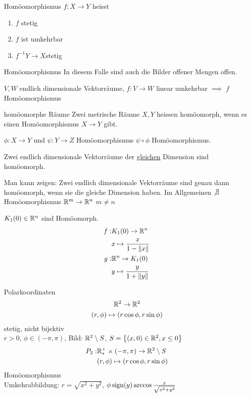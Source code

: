 \begin{Def}{Homöomorphismus}
  $f:X\to Y$ heisst
  \begin{enumerate}
    \item $f$ stetig
    \item $f$ ist umkehrbar
    \item $f^{-1}Y\to X$stetig
  \end{enumerate}
\end{Def}
\begin{Eig}{Homöomorphismus}
  In diesem Falle sind auch die Bilder offener Mengen offen.  
\end{Eig}
\begin{Bsp}
  $V,W$ endlich dimensionale Vektorräume, $f:V\to W$ linear umkehrbar $\implies$ $f$ Homöomorphismus
\end{Bsp}
\begin{Def}{homöomorphe Räume}
  Zwei metrische Räume $X,Y$ heissen homöomorph, wenn es einen Homöomorphismus $X\to Y$ gibt.
\end{Def}
\begin{Bem}
  $\phi:X\to Y$ und $\psi:Y\to Z$ Homöomorphismus $\psi\circ\phi$ Homöomorphismus.
\end{Bem}
\begin{Bsp}
  Zwei endlich dimensionale Vektorräume der \underline{gleichen} Dimension sind homöomorph.
\end{Bsp}
\begin{Bem}
  Man kann zeigen: Zwei endlich dimensionale Vektorräume sind genau dann homöomorph, wenn sie die gleiche Dimension haben. Im Allgemeinen $\not\exists$ Homöomorphismus $\mathbb{R}^m\to\mathbb{R}^n$ $m\neq n$
\end{Bem}
\begin{Bsp}
  $K_1(0)\in\mathbb{R}^n$ sind Homöomorph.
  \begin{align*}
    f:&K_1(0)\to\mathbb{R}^n\\
    &x\mapsto \frac{x}{1-\left\| x \right\|}\\
    g:&\mathbb{R}^n\to K_1(0)\\
    &y\mapsto \frac{y}{1+\left\| y \right\|}
  \end{align*}
\end{Bsp}
\begin{Bem}
  Polarkoordinaten
  \begin{gather*}
    \mathbb{R}^2\to\mathbb{R}^2\\
    (r,\phi)\mapsto \left( r\cos \phi, r\sin \phi \right)
  \end{gather*}
  stetig, nicht bijektiv\\
  $r>0$, $\phi\in\left( -\pi, \pi \right)$, Bild: $\mathbb{R}^2\setminus S$, $S=\left\{ (x,0)\in\mathbb{R}^2, x\leq 0 \right\}$
  \begin{align*}
    P_2:&\mathbb{R}^+_*\times (-\pi,\pi)\to\mathbb{R}^2\setminus S\\
    &(r,\phi)\mapsto\left( r\cos \phi, r\sin \phi \right)
  \end{align*}
  Homöomorphismus\\
  Umkehrabbildung: $r=\sqrt{x^2+y^2}$, $\phi \operatorname{sign}(y)\arccos\frac{x}{\sqrt{x^2+y^2}}$
\end{Bem}
